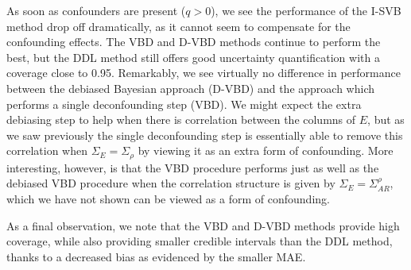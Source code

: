 \documentclass[11pt]{article}
\begin{document}
As soon as confounders are present ($q > 0$), we see the performance of the I-SVB method drop off dramatically, as it cannot seem to compensate for the confounding effects. The VBD and D-VBD methods continue to perform the best, but the DDL method still offers good uncertainty quantification with a coverage close to 0.95. Remarkably, we see virtually no difference in performance between the debiased Bayesian approach (D-VBD) and the approach which performs a single deconfounding step (VBD). We might expect the extra debiasing step to help when there is correlation between the columns of $E$, but as we saw previously the single deconfounding step is essentially able to remove this correlation when $\Sigma_E = \Sigma_\rho$ by viewing it as an extra form of confounding. More interesting, however, is that the VBD procedure performs just as well as the debiased VBD procedure when the correlation structure is given by $\Sigma_E = \Sigma_{AR}^\rho$, which we have not shown can be viewed as a form of confounding. 

As a final observation, we note that the VBD and D-VBD methods provide high coverage, while also providing smaller credible intervals than the DDL method, thanks to a decreased bias as evidenced by the smaller MAE.
\end{document}
